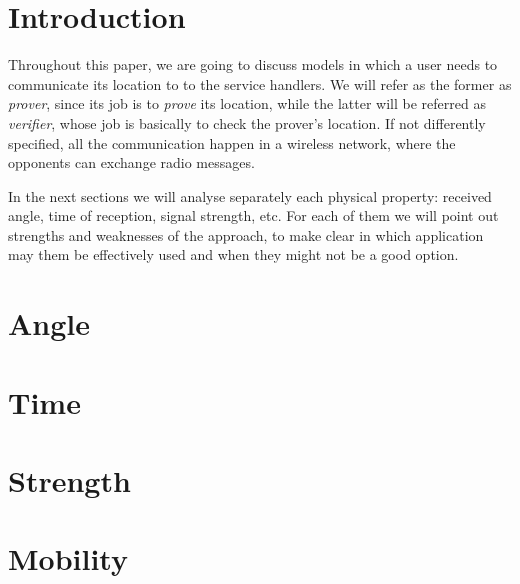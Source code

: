 \documentclass[conference]{IEEEtran}
\begin{document}
\section{Introduction}
Throughout this paper, we are going to discuss models in which a user needs to communicate its location to to the service handlers. We will refer as the former as \emph{prover}, since its job is to \emph{prove} its location, while the latter will be referred as \emph{verifier}, whose job is basically to check the prover's location. If not differently specified, all the communication happen in a wireless network, where the opponents can exchange radio messages.

In the next sections we will analyse separately each physical property: received angle, time of reception, signal strength, etc. For each of them we will point out strengths and weaknesses of the approach, to make clear in which application may them be effectively used and when they might not be a good option.

\section{Angle}


\section{Time}


\section{Strength}


\section{Mobility}

\end{document}
